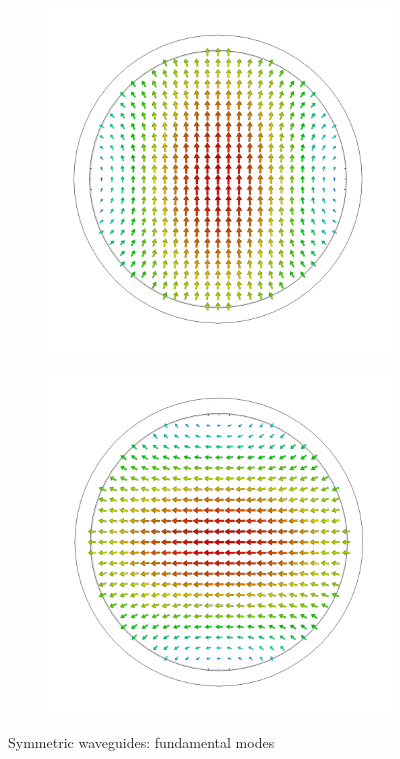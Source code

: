 \documentclass[11pt,a4paper,twoside,openany]{report}
\begin{document}
\begin{figure}
    \begin{subfigure}{.45\textwidth}
        \centering
        \includegraphics[width=.75\textwidth]{src/waveguide_circular_mode1.png}
        \caption{\label{fig:circular-waveguide-mode1}}
    \end{subfigure}
    \hspace{0.5cm}
    \begin{subfigure}{.45\textwidth}
        \centering
        \includegraphics[width=.75\textwidth]{src/waveguide_circular_mode2.png}
        \caption{\label{fig:circular-waveguide-mode2}}
    \end{subfigure}
    \caption{\label{fig:symmetric-waveguide-modes}Symmetric waveguides: fundamental modes}
\end{figure}
\end{document}
